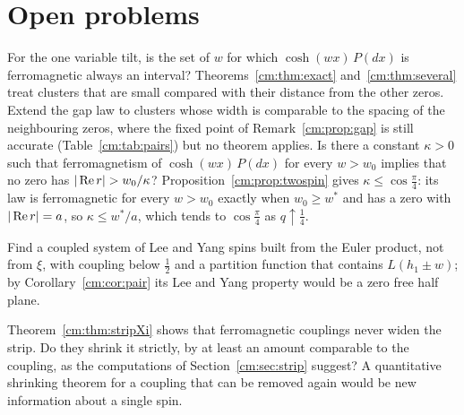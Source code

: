 \section{Open problems}\label{cm:sec:open}

\begin{problem}\label{cm:prob:interval}
For the one variable tilt, is the set of $w$ for which $\cosh(wx)\,P(dx)$ is ferromagnetic always an interval? Theorems~\ref{cm:thm:exact} and~\ref{cm:thm:several} treat clusters that are small compared with their distance from the other zeros. Extend the gap law to clusters whose width is comparable to the spacing of the neighbouring zeros, where the fixed point of Remark~\ref{cm:prop:gap} is still accurate (Table~\ref{cm:tab:pairs}) but no theorem applies. Is there a constant $\kappa>0$ such that ferromagnetism of $\cosh(wx)\,P(dx)$ for every $w>w_0$ implies that no zero has $|\re r|>w_0/\kappa$? Proposition~\ref{cm:prop:twospin} gives $\kappa\le\cos\frac\pi4$: its law is ferromagnetic for every $w>w_0$ exactly when $w_0\ge w^*$ and has a zero with $|\operatorname{Re} r|=a$, so $\kappa\le w^*/a$, which tends to $\cos\frac\pi4$ as $q\uparrow\frac14$.
\end{problem}

\begin{problem}\label{cm:prob:euler}
Find a coupled system of Lee and Yang spins built from the Euler product, not from $\xi$, with coupling below $\frac12$ and a partition function that contains $L(h_1\pm w)$; by Corollary~\ref{cm:cor:pair} its Lee and Yang property would be a zero free half plane.
\end{problem}

\begin{problem}\label{cm:prob:strip}
Theorem~\ref{cm:thm:stripXi} shows that ferromagnetic couplings never widen the strip. Do they shrink it strictly, by at least an amount comparable to the coupling, as the computations of Section~\ref{cm:sec:strip} suggest? A quantitative shrinking theorem for a coupling that can be removed again would be new information about a single spin.
\end{problem}
